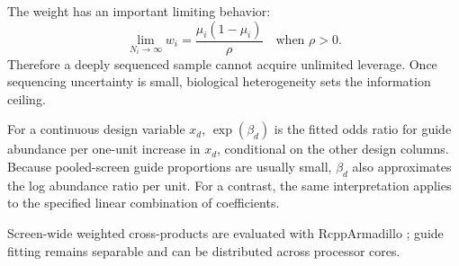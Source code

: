 The weight has an important limiting behavior:
\begin{equation}
  \lim_{N_i\rightarrow\infty} w_i
  = \frac{\mu_i(1-\mu_i)}{\rho}
  \quad\text{when }\rho>0.
\end{equation}
Therefore a deeply sequenced sample cannot acquire unlimited leverage.  Once
sequencing uncertainty is small, biological heterogeneity sets the information
ceiling.

For a continuous design variable $x_d$, $\exp(\beta_d)$ is the fitted odds
ratio for guide abundance per one-unit increase in $x_d$, conditional on the
other design columns.  Because pooled-screen guide proportions are usually
small, $\beta_d$ also approximates the log abundance ratio per unit.  For a
contrast, the same interpretation applies to the specified linear combination
of coefficients.

Screen-wide weighted cross-products are evaluated with RcppArmadillo
\citep{eddelbuettel2014rcpparmadillo}; guide fitting remains separable and can
be distributed across processor cores.
